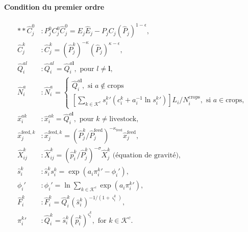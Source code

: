 \paragraph{Condition du premier ordre}
\begin{align}
	** \hat{C}_j^0            & : P_j^0 C_j^0 \hat{C}_j^0 = E_j \hat{E}_j - P_jC_j (\hat{P}_j)^{1 - \epsilon},                                                      \\
	\hat{C}_j^k               & : \hat{C}_j^k = (\hat{P}_j^k)^{-\kappa} (\hat{P}_j)^{\kappa - \epsilon},                                                            \\
	\hat{Q}_i^{al}            & : \hat{Q}_i^{al}=\hat{Q}_i^{a \mathbf{l}}, \text{ pour } l \neq \mathbf{l},                                                         \\
	\hat{N}_i^a               & : \hat{N}_i^a =
	\begin{cases}
		\hat{Q}_i^{a \mathbf{l}}, \text{ si } a \notin \text{crops} \\
		\left[\sum_{k \in \mathcal{K}^c} {s_i^k}\prime \left(c_i^k+a_i^{-1} \ln {s_i^k}\prime  \right) \right] L_i / N_i^{\text{crops}}, \text{ si } a \in \text{crops},
	\end{cases}                                    \\
	\hat{x}_i^{ak}            & :\hat{x}_i^{ak}=\hat{Q}_i^{a \mathbf{l}}, \text{ pour } k \neq \text{livestock},                                                    \\
	\hat{x}^{\text{feed},k}_j & : \hat{x}^{\text{feed},k}_j = \left({\hat{P}_j^k} /{\hat{P}_j^{\text{feed}}} \right)^{-\kappa_{\text{feed}}} \hat{x}_j^\text{feed}, \\
	\hat{X}_{ij}^k            & : \hat{X}_{ij}^k = (\hat{p}_i^k/\hat{P}_j^k)^{-\sigma} \hat{X}_j^k \text{ (équation de gravité)},                                   \\
	\hat{s}_{i}^{k}           & : \hat{s}_i^k s_i^k = \exp \left( a_i {\pi_i^k}\prime - \phi_i\prime \right),                                                       \\
	\phi_i\prime              & : \phi_i\prime = \ln \sum_{k \in \mathcal{K}^c} \exp(a_i {\pi_i^k}\prime),                                                          \\
	\hat{F}_i^k               & : \hat{F}_i^k = \hat{Q}_i^k (\hat{s}_i^k)^{- 1 / (1 + \varsigma_i^k)},                                                              \\
	{\pi_i^k}\prime           & : \hat{Q}_i^k = \hat{s}_i^k \left(\hat{p}_i^k \right)^{\varsigma_i^k}, \text{ for } k\in \mathcal{K}^{c}.
\end{align}

